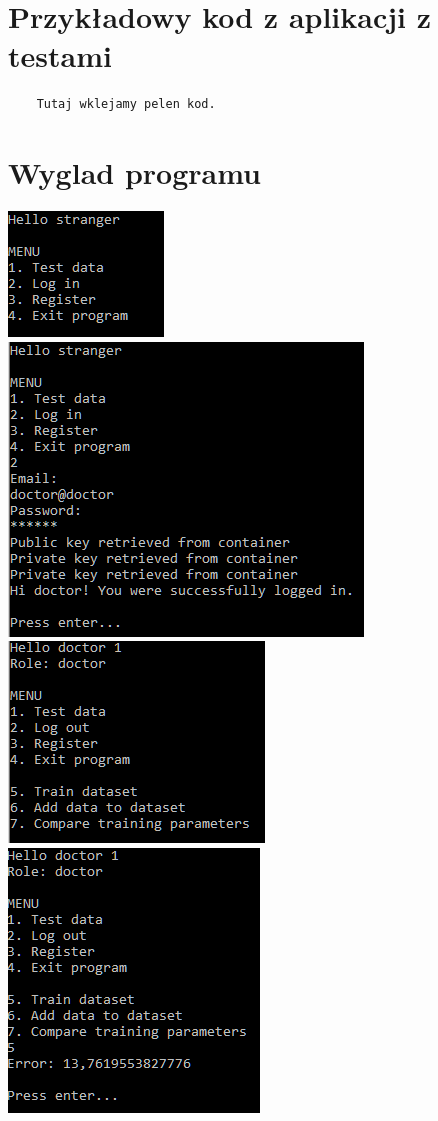 \documentclass[12pt,a4paper]{article}
\begin{document}
	

\section*{Przykładowy kod z aplikacji z testami}


\begin{lstlisting}
	Tutaj wklejamy pelen kod. 
\end{lstlisting}

\section*{Wyglad programu}

\includegraphics[width=0.4\linewidth]{media/program1}
\includegraphics[width=0.4\linewidth]{media/program2}\\
\includegraphics[width=0.4\linewidth]{media/program3}
\includegraphics[width=0.4\linewidth]{media/program4}\\
\end{document}
